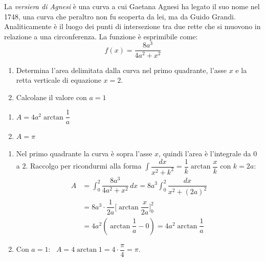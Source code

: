 \begin{question}[ID=4.1, subtitle={Area della versiera di Agnesi nel primo quadrante}, tags={integrali, area, applicazioni}, difficulty=difficile]
La \textit{versiera di Agnesi} è una curva a cui Gaetana Agnesi ha legato il suo nome nel 1748, una curva che peraltro non fu scoperta da lei, ma da Guido Grandi. Analiticamente è il luogo dei punti di intersezione tra due rette che si muovono in relazione a una circonferenza. La funzione è esprimibile come:
\begin{equation*}
    f(x) = \frac{8a^3}{4a^2 + x^2}
\end{equation*}
\begin{enumerate}
    \item Determina l'area delimitata dalla curva nel primo quadrante, l'asse $x$ e la retta verticale di equazione $x=2$.
    \item Calcolane il valore con $a=1$
\end{enumerate}
\begin{solution}
\begin{enumerate}
    \item $A=4a^2\arctan\dfrac1a$
    \item $A=\pi$
\end{enumerate}
\end{solution}
\begin{explanation}
\begin{enumerate}
    \item Nel primo quadrante la curva è sopra l'asse $x$, quindi l'area è l'integrale da $0$ a $2$. Raccolgo per ricondurmi alla forma $\int\dfrac{dx}{x^2+k^2}=\dfrac1k\arctan\dfrac xk$ con $k=2a$:
    \[\begin{aligned}
    A &= \int_0^2\dfrac{8a^3}{4a^2+x^2}\,dx=8a^3\int_0^2\dfrac{dx}{x^2+(2a)^2}\\
    &= 8a^3\cdot\dfrac{1}{2a}\Big[\arctan\dfrac{x}{2a}\Big]_0^2\\
    &= 4a^2\left(\arctan\dfrac1a-0\right)=4a^2\arctan\dfrac1a
    \end{aligned}\]
    \item Con $a=1$: \ $A=4\arctan1=4\cdot\dfrac\pi4=\pi$.
\end{enumerate}
\end{explanation}
\end{question}


